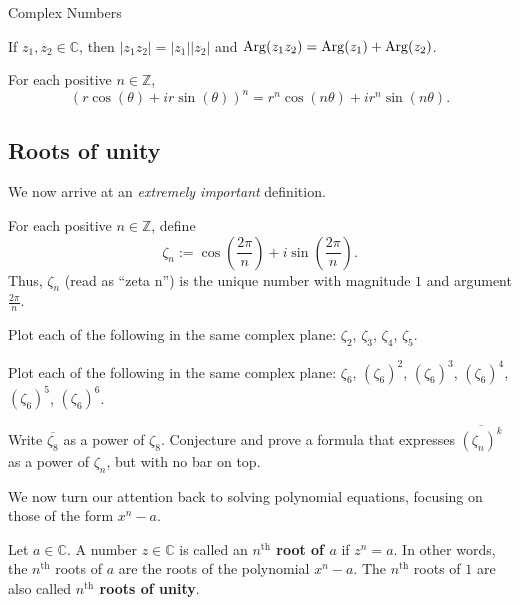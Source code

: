 \begin{section}{Complex Numbers}
\begin{corollary}
If $z_1,z_2\in \mathbb{C}$, then $|z_1z_2| = |z_1||z_2|$ and $\operatorname{Arg}(z_1z_2) = \operatorname{Arg}(z_1)+\operatorname{Arg}(z_2)$.
\end{corollary}

\begin{corollary}\label{cor.DeMoivre}
For each positive $n\in \mathbb{Z}$, \[\left(r\cos(\theta) + ir\sin(\theta)\right)^n = r^n\cos(n\theta) + ir^n\sin(n\theta).\]
\end{corollary}

\subsection{Roots of unity}
We now arrive at an \emph{extremely important} definition.

\begin{definition}
For each positive $n\in \mathbb{Z}$, define \[\zeta_n := \cos\left(\frac{2\pi}{n}\right) + i\sin\left(\frac{2\pi}{n}\right).\]
Thus, $\zeta_n$ (read as ``zeta n'') is the unique  number with magnitude $1$ and argument $\frac{2\pi}{n}$.
\end{definition}

\begin{problem}
Plot each of the following in the same complex plane: $\zeta_2$, $\zeta_3$, $\zeta_4$, $\zeta_5$.
\end{problem}

\begin{problem}
Plot each of the following in the same complex plane: $\zeta_6$, $(\zeta_6)^2$, $(\zeta_6)^3$, $(\zeta_6)^4$, $(\zeta_6)^5$, $(\zeta_6)^6$.
\end{problem}

\begin{problem}
Write $\overline{\zeta_8}$ as a power of $\zeta_8$. Conjecture and prove a formula that expresses $\overline{(\zeta_n)^k}$ as a power of $\zeta_n$, but with no bar on top.
\end{problem}

We now turn our attention back to solving polynomial equations, focusing on those of the form $x^n - a$.

\begin{definition}
Let $a\in \mathbb{C}$. A number $z\in \mathbb{C}$ is called an \textbf{$n^\text{th}$ root of $a$} if $z^n = a$. In other words, the  $n^\text{th}$ roots of $a$ are the roots of the polynomial $x^n-a$. The  $n^\text{th}$ roots of $1$ are also called \textbf{$n^\text{th}$ roots of unity}.
\end{definition}


\end{section}
